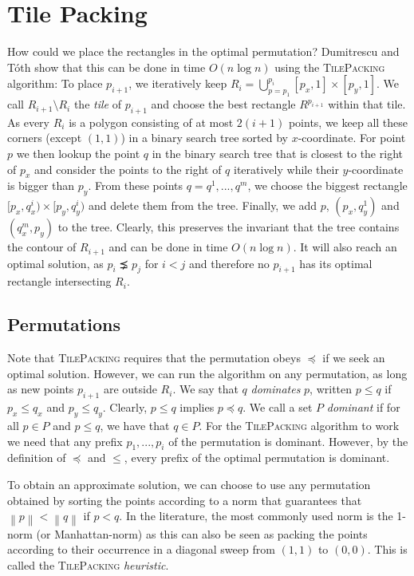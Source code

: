 \documentclass[11pt, a4paper, twocolumn]{article}
\newcommand{\norm}[1]{\left\lVert#1\right\rVert}
\begin{document}
\section{Tile Packing}
\label{tiled}

How could we place the rectangles in the optimal permutation? Dumitrescu and Tóth \cite{dumitrescu2015packing}
show that this can be done in time $O(n\log n)$ using the \textsc{TilePacking} algorithm:
To place $p_{i+1}$, we iteratively keep $R_i = \bigcup_{p=p_1}^{p_i} [p_x, 1] \times [p_y, 1]$.
We call $R_{i+1} \setminus R_i$ the \textit{tile} of $p_{i+1}$ and choose the best rectangle $R^{p_{i+1}}$ within
that tile. As every $R_i$ is a polygon consisting of at most $2(i + 1)$ points, we keep
all these corners (except $(1,1)$) in a binary search tree sorted by $x$-coordinate.
For point $p$ we then lookup the point $q$ in the binary search tree that is
closest to the right of $p_x$ and consider the points to the right of $q$
iteratively while their $y$-coordinate is bigger than $p_y$. From these points
$q = q^1, ..., q^m$, we choose the biggest rectangle $[p_x, q^i_x) \times [p_y, q^i_y)$
and delete them from the tree. Finally, we add $p$, $(p_x, q^1_y)$ and $(q^m_x, p_y)$ to the tree.
Clearly, this preserves the invariant that the tree contains the contour of $R_{i+1}$
and can be done in time $O(n \log n)$. It will also reach an optimal solution, as $p_i \precneq p_j$
for $i < j$ and therefore no $p_{i+1}$ has its optimal rectangle intersecting $R_i$.

\subsection{Permutations}

Note that \textsc{TilePacking} requires that the permutation obeys $\preceq$ if we seek an optimal solution.
However, we can run the algorithm on any permutation, as long as new points $p_{i+1}$ are
outside $R_i$. We say that $q$ \textit{dominates} $p$, written $p \leq q$ if
$p_x \leq q_x$ and $p_y \leq q_y$. Clearly, $p \leq q$ implies $p \preceq q$.
We call a set $P$ \textit{dominant} if for all $p \in P$ and $p \leq q$,
we have that $q \in P$. For the \textsc{TilePacking} algorithm to work we need that any
prefix $p_1, ..., p_i$ of the permutation is dominant. However, by the definition of $\preceq$ and
$\leq$, every prefix of the optimal permutation is dominant.

To obtain an approximate solution, we can choose to use any permutation obtained
by sorting the points according to a norm that guarantees that $\norm{p} < \norm{q}$ if $p < q$.
In the literature, the most commonly used norm is the 1-norm
(or Manhattan-norm) as this can also be seen as packing the points according to
their occurrence in a diagonal sweep from $(1,1)$ to $(0,0)$.
This is called the \textsc{TilePacking} \textit{heuristic}.
\end{document}
